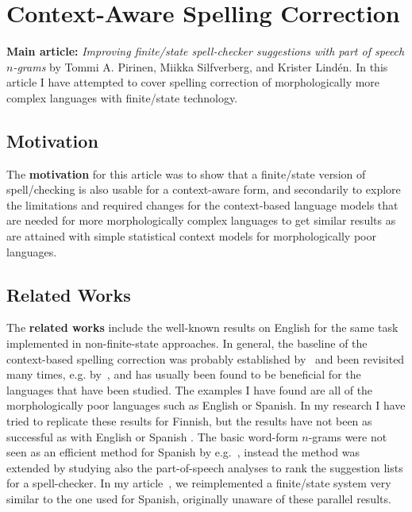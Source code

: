 \documentclass[officiallayout,final]{unihelcompling}
\begin{document}
\section{Context-Aware Spelling Correction}
\label{sec:context}

\textbf{Main article:} \emph{Improving finite\-/state spell-checker suggestions
with part of speech \(n\)-grams} by Tommi A. Pirinen, Miikka Silfverberg, and
Krister Lindén. In this article I have attempted to cover spelling
correction of morphologically more complex languages with finite\-/state
technology.

\subsection{Motivation}

The \textbf{motivation} for this article was to show that a finite\-/state
version of spell\-/checking is also usable for a context-aware form, and
secondarily to explore the limitations and required changes for the
context-based language models that are needed for more morphologically complex
languages to get similar results as are attained with simple statistical
context models for morphologically poor languages.

\subsection{Related Works}

The \textbf{related works} include the well-known results on English for the
same task implemented in non-finite-state approaches.  In general, the baseline
of the context-based spelling correction was probably established
by~\citet{mays1991context} and been revisited many times, e.g.
by~\citet{wilcox-ohearn2008realword}, and has usually been found to be
beneficial for the languages that have been studied. The examples I have found
are all of the morphologically poor languages such as English or Spanish. In my
research I have tried to replicate these results for Finnish, but the results
have not been as successful as with English or Spanish .  The basic word-form
\(n\)-grams were not seen as an efficient method for Spanish by
e.g.~\citet{otero2007contextual}, instead the method was extended by studying
also the part-of-speech analyses to rank the suggestion lists for a
spell-checker. In my article~, we
reimplemented a finite\-/state system very similar to the one used for Spanish,
originally unaware of these parallel results.
\end{document}
